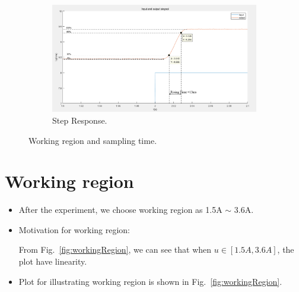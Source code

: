 \documentclass[10pt,a4paper]{article}
\begin{document}
\begin{itemize}
\begin{figure}[ht]
\begin{subfigure}[t]{.49\linewidth}
		\includegraphics[width=\columnwidth]{findSamplingTime.png} 
		\caption{Step Response.}
		\label{fig:samplingTime}
		\end{subfigure}
		\caption{Working region and sampling time.}
		\label{fig:workingRegionAndSamplingTime}
	\end{figure}
\end{itemize}

\section{Working region}
\begin{itemize}
    \item After the experiment, we choose working region as 1.5A $\sim$ 3.6A.
    \item Motivation for working region:
    \par From Fig.~\ref{fig:workingRegion}, we can see that when $u \in [1.5A, 3.6A]$, the plot have linearity.
    \item Plot for illustrating working region is shown in Fig.~\ref{fig:workingRegion}.
\end{itemize}
%		 

\end{document}
